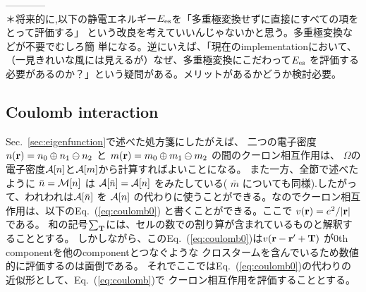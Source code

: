 \documentclass[twocolumn,showpacs,preprintnumbers,amsmath,amssymb,floatfix]{revtex4-1}
\newcommand{\bfr}{{\bf r}}
\newcommand{\bfT}{{\bf T}}
\def\calR{{\cal A}}
\newcommand{\req}[1]{\mbox{Eq.~\!(\ref{#1})}}
\newcommand{\refsec}[1]{\mbox{Sec.~\!\ref{#1}}}
\def\MM{{\cal M}}
\begin{document}
------------\\
＊将来的に,以下の静電エネルギー$E_{\rm es}$を「多重極変換せずに直接にすべての項をとって評価する」
という改良を考えていいんじゃないかと思う。多重極変換などが不要でむしろ簡
単になる。逆にいえば、「現在のimplementationにおいて、
（一見きれいな風には見えるが）なぜ、多重極変換にこだわって$E_{\rm es}$
を評価する必要があるのか？」という疑問がある。メリットがあるかどうか検討必要。

\subsection{Coulomb interaction}
\label{sec:coulomb} 
\refsec{sec:eigenfunction}で述べた処方箋にしたがえば、
二つの電子密度$n(\bfr)=n_0\oplus n_1 \ominus n_2$ と
$m(\bfr)=m_0 \oplus m_1 \ominus m_2$  の間のクーロン相互作用は、
$\Omega$の電子密度$\calR[n]$と$\calR[m]$から計算すればよいことになる。
また一方、全節で述べたように
$\bar{n}=\MM[n]$ は $\calR[\bar{n}]=\calR[n]$ をみたしている( $\bar{m}$
についても同様).したがって、われわれは$\calR[\bar{n}]$ を $\calR[n]$ 
の代わりに使うことができる。なのでクーロン相互作用は、以下の\req{eq:coulomb0}
と書くことができる。ここで $v(\bfr)=e^2/|\bfr|$である。
和の記号$\sum_{\bfT}$には、セルの数での割り算が含まれているものと解釈することとする。
しかしながら、この\req{eq:coulomb0}は$v(\bfr-\bfr'+\bfT)$
が0th componentを他のcomponentとつなぐような
クロスタームを含んでいるため数値的に評価するのは面倒である。
それでここでは\req{eq:coulomb0}の代わりの近似形として、\req{eq:coulomb}で
クーロン相互作用を評価することとする。
\end{document}
